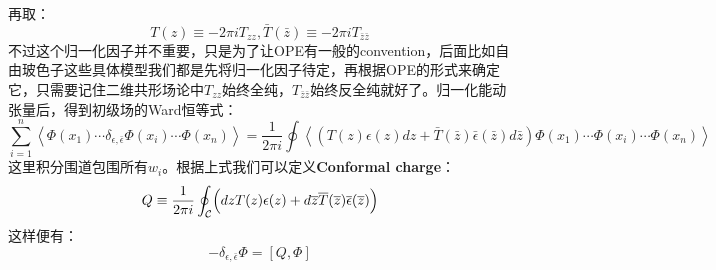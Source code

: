 再取：
\begin{equation}
	T(z)\equiv-2\pi iT_{zz},\bar T(\bar z)\equiv-2\pi iT_{\bar z\bar z}
\end{equation}
不过这个归一化因子并不重要，只是为了让OPE有一般的convention，后面比如自由玻色子这些具体模型我们都是先将归一化因子待定，再根据OPE的形式来确定它，只需要记住二维共形场论中$T_{zz}$始终全纯，$T_{\bar z\bar z}$始终反全纯就好了。归一化能动张量后，得到初级场的Ward恒等式：
\begin{equation}\label{ward}
	\boxed{
	\sum_{i=1}^{n}\left<\Phi(x_{1})\cdots\delta_{\epsilon,\bar \epsilon}\Phi(x_{i})\cdots\Phi(x_{n})\right>=\frac{1}{2\pi i}\oint\left\langle\left(T(z)\epsilon(z)dz+\bar T(\bar z)\bar \epsilon(\bar z)d\bar z\right)\Phi(x_{1})\cdots\Phi(x_{i})\cdots\Phi(x_{n})\right\rangle
	}
\end{equation}
这里积分围道包围所有$w_i$。根据上式我们可以定义\textbf{Conformal charge}：
\begin{equation}
	Q\equiv\frac{1}{2\pi i}\oint_{\mathcal{C}}\Bigl(dzT(z)\epsilon(z)+d\overline{z}\overline{T}(\overline{z})\overline{\epsilon}(\overline{z})\Bigr)
\end{equation}
这样便有：
\begin{equation}\label{eq:31.9}
	-\delta_{\epsilon,\bar\epsilon}\Phi=\left[Q,\Phi\right]
\end{equation}
